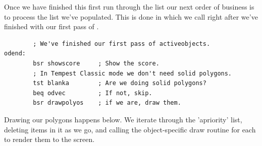 Once we have finished this first run through the  list our next order of business
is to process the  list we've populated. This is done in  which we
call right after we've finished with our first pass of . 

\begin{lstlisting}
        ; We've finished our first pass of activeobjects.
odend:
        bsr showscore     ; Show the score.
        ; In Tempest Classic mode we don't need solid polygons.
        tst blanka        ; Are we doing solid polygons?
        beq odvec         ; If not, skip.
        bsr drawpolyos    ; if we are, draw them.
\end{lstlisting}

Drawing our polygons happens below. We iterate through the 'apriority' list, deleting items in it
as we go, and calling the object-specific draw routine for each to render them to the screen.


